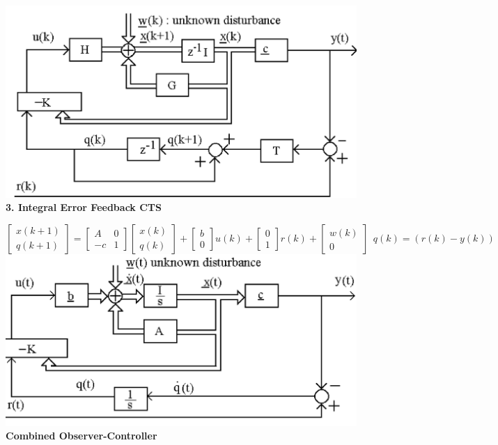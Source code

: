 \includegraphics[width=\linewidth]{DiscreteIntegralTracking.png}
\textbf{3. Integral Error Feedback CTS} 

$ \begin{bmatrix} x(k+1) \\ q(k+1)\end{bmatrix} =
\begin{bmatrix}A & 0 \\ -c & 1\end{bmatrix}\begin{bmatrix}x(k) \\ q(k)\end{bmatrix}+
\begin{bmatrix}b \\ 0\end{bmatrix}u(k)+\begin{bmatrix} 0 \\ 1\end{bmatrix}r(k)+\begin{bmatrix}w(k) \\ 0\end{bmatrix} \ \
q(k)=(r(k)-y(k)) $
\includegraphics[width=\linewidth]{CTSIntegralTracking.png}
\textbf{Combined Observer-Controller}


